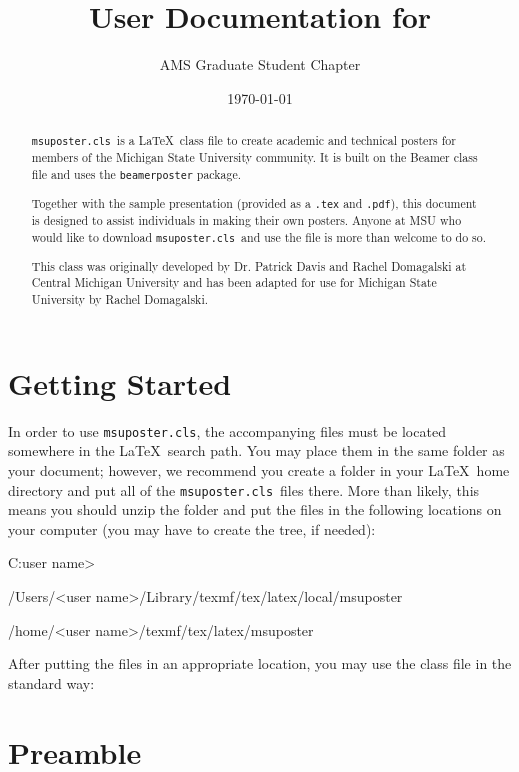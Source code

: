 \documentclass[11pt]{article}
\title{User Documentation for \cls}
\author{AMS Graduate Student Chapter}
\date{\today}
\newcommand{\cls}{\lstinline[basicstyle=\ttfamily]!msuposter.cls!}
\newcommand{\code}[1]{\lstinline[basicstyle=\ttfamily]!#1!}
\begin{document}
\maketitle
\begin{abstract}
\cls\ is a \LaTeX\ class file to create academic and technical posters for members of the Michigan State University community.  It is built on the Beamer class file and uses the \code{beamerposter} package.

Together with the sample presentation (provided as a \code{.tex} and \code{.pdf}), this document is designed to assist individuals in making their own posters.  Anyone at MSU who would like to download \cls\ and use the file is more than welcome to do so.

This class was originally developed by Dr. Patrick Davis and Rachel Domagalski at Central Michigan University and has been adapted for use for Michigan State University by Rachel Domagalski.

\end{abstract}

\tableofcontents

\section*{Getting Started}

In order to use \cls, the accompanying files must be located somewhere in the \LaTeX\ search path.  You may place them in the same folder as your document; however, we recommend you create a folder in your \LaTeX\ home directory and put all of the \cls\ files there.  More than likely, this means you should unzip the folder and put the files in the following locations on your computer (you may have to create the tree, if needed):

\begin{tex}
C:\Users\<user name>\texmf\tex\latex\local\msuposter

/Users/<user name>/Library/texmf/tex/latex/local/msuposter

/home/<user name>/texmf/tex/latex/msuposter
\end{tex}

After putting the files in an appropriate location, you may use the class file in the standard way:

\section{Preamble}
\end{document}
